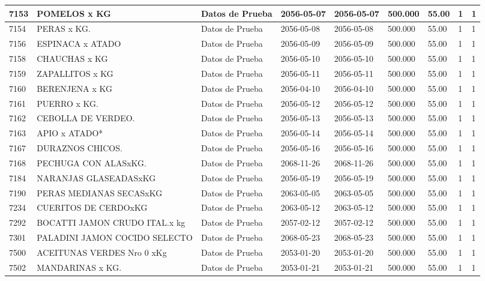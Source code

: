 \documentclass[a4paper,12pt]{article}
\begin{document}
\begin{landscape}
\begin{longtable}{|p{4cm}|p{2.5cm}|p{2.5cm}|p{1.8cm}|p{1.8cm}|p{1cm}|p{1cm}|p{3cm}|p{3cm}||}
7153 & POMELOS x KG & Datos de Prueba & 2056-05-07 & 2056-05-07 & 500.000 & 55.00 & 1 & 1 \\ \hline 
7154 & PERAS x KG. & Datos de Prueba & 2056-05-08 & 2056-05-08 & 500.000 & 55.00 & 1 & 1 \\ \hline 
7156 & ESPINACA x ATADO & Datos de Prueba & 2056-05-09 & 2056-05-09 & 500.000 & 55.00 & 1 & 1 \\ \hline 
7158 & CHAUCHAS x KG & Datos de Prueba & 2056-05-10 & 2056-05-10 & 500.000 & 55.00 & 1 & 1 \\ \hline 
7159 & ZAPALLITOS x KG & Datos de Prueba & 2056-05-11 & 2056-05-11 & 500.000 & 55.00 & 1 & 1 \\ \hline 
7160 & BERENJENA x KG & Datos de Prueba & 2056-04-10 & 2056-04-10 & 500.000 & 55.00 & 1 & 1 \\ \hline 
7161 & PUERRO x KG. & Datos de Prueba & 2056-05-12 & 2056-05-12 & 500.000 & 55.00 & 1 & 1 \\ \hline 
7162 & CEBOLLA DE VERDEO. & Datos de Prueba & 2056-05-13 & 2056-05-13 & 500.000 & 55.00 & 1 & 1 \\ \hline 
7163 & APIO x ATADO* & Datos de Prueba & 2056-05-14 & 2056-05-14 & 500.000 & 55.00 & 1 & 1 \\ \hline 
7167 & DURAZNOS CHICOS. & Datos de Prueba & 2056-05-16 & 2056-05-16 & 500.000 & 55.00 & 1 & 1 \\ \hline 
7168 & PECHUGA CON ALASxKG. & Datos de Prueba & 2068-11-26 & 2068-11-26 & 500.000 & 55.00 & 1 & 1 \\ \hline 
7184 & NARANJAS GLASEADASxKG & Datos de Prueba & 2056-05-19 & 2056-05-19 & 500.000 & 55.00 & 1 & 1 \\ \hline 
7190 & PERAS MEDIANAS SECASxKG & Datos de Prueba & 2063-05-05 & 2063-05-05 & 500.000 & 55.00 & 1 & 1 \\ \hline 
7234 & CUERITOS DE CERDOxKG & Datos de Prueba & 2063-05-12 & 2063-05-12 & 500.000 & 55.00 & 1 & 1 \\ \hline 
7292 & BOCATTI JAMON CRUDO ITAL.x kg & Datos de Prueba & 2057-02-12 & 2057-02-12 & 500.000 & 55.00 & 1 & 1 \\ \hline 
7301 & PALADINI JAMON COCIDO SELECTO & Datos de Prueba & 2068-05-23 & 2068-05-23 & 500.000 & 55.00 & 1 & 1 \\ \hline 
7500 & ACEITUNAS VERDES Nro 0 xKg & Datos de Prueba & 2053-01-20 & 2053-01-20 & 500.000 & 55.00 & 1 & 1 \\ \hline 
7502 & MANDARINAS x KG. & Datos de Prueba & 2053-01-21 & 2053-01-21 & 500.000 & 55.00 & 1 & 1 \\ \hline 

\end{longtable}
\end{landscape}
\end{document}
